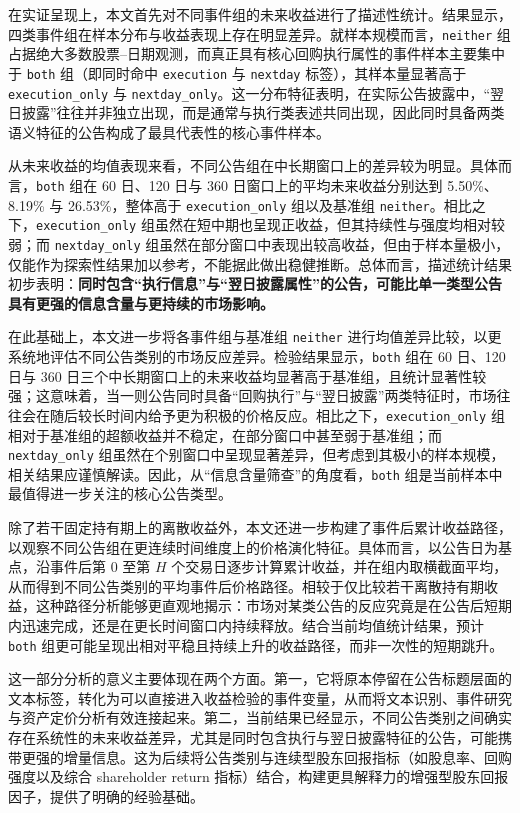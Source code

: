 \documentclass[a4paper,10pt]{article}
\begin{document}
在实证呈现上，本文首先对不同事件组的未来收益进行了描述性统计。结果显示，四类事件组在样本分布与收益表现上存在明显差异。就样本规模而言，\texttt{neither} 组占据绝大多数股票--日期观测，而真正具有核心回购执行属性的事件样本主要集中于 \texttt{both} 组（即同时命中 \texttt{execution} 与 \texttt{nextday} 标签），其样本量显著高于 \texttt{execution\_only} 与 \texttt{nextday\_only}。这一分布特征表明，在实际公告披露中，“翌日披露”往往并非独立出现，而是通常与执行类表述共同出现，因此同时具备两类语义特征的公告构成了最具代表性的核心事件样本。

从未来收益的均值表现来看，不同公告组在中长期窗口上的差异较为明显。具体而言，\texttt{both} 组在 60 日、120 日与 360 日窗口上的平均未来收益分别达到 5.50\%、8.19\% 与 26.53\%，整体高于 \texttt{execution\_only} 组以及基准组 \texttt{neither}。相比之下，\texttt{execution\_only} 组虽然在短中期也呈现正收益，但其持续性与强度均相对较弱；而 \texttt{nextday\_only} 组虽然在部分窗口中表现出较高收益，但由于样本量极小，仅能作为探索性结果加以参考，不能据此做出稳健推断。总体而言，描述统计结果初步表明：\textbf{同时包含“执行信息”与“翌日披露属性”的公告，可能比单一类型公告具有更强的信息含量与更持续的市场影响。}

在此基础上，本文进一步将各事件组与基准组 \texttt{neither} 进行均值差异比较，以更系统地评估不同公告类别的市场反应差异。检验结果显示，\texttt{both} 组在 60 日、120 日与 360 日三个中长期窗口上的未来收益均显著高于基准组，且统计显著性较强；这意味着，当一则公告同时具备“回购执行”与“翌日披露”两类特征时，市场往往会在随后较长时间内给予更为积极的价格反应。相比之下，\texttt{execution\_only} 组相对于基准组的超额收益并不稳定，在部分窗口中甚至弱于基准组；而 \texttt{nextday\_only} 组虽然在个别窗口中呈现显著差异，但考虑到其极小的样本规模，相关结果应谨慎解读。因此，从“信息含量筛查”的角度看，\texttt{both} 组是当前样本中最值得进一步关注的核心公告类型。

除了若干固定持有期上的离散收益外，本文还进一步构建了事件后累计收益路径，以观察不同公告组在更连续时间维度上的价格演化特征。具体而言，以公告日为基点，沿事件后第 \(0\) 至第 \(H\) 个交易日逐步计算累计收益，并在组内取横截面平均，从而得到不同公告类别的平均事件后价格路径。相较于仅比较若干离散持有期收益，这种路径分析能够更直观地揭示：市场对某类公告的反应究竟是在公告后短期内迅速完成，还是在更长时间窗口内持续释放。结合当前均值统计结果，预计 \texttt{both} 组更可能呈现出相对平稳且持续上升的收益路径，而非一次性的短期跳升。

这一部分分析的意义主要体现在两个方面。第一，它将原本停留在公告标题层面的文本标签，转化为可以直接进入收益检验的事件变量，从而将文本识别、事件研究与资产定价分析有效连接起来。第二，当前结果已经显示，不同公告类别之间确实存在系统性的未来收益差异，尤其是同时包含执行与翌日披露特征的公告，可能携带更强的增量信息。这为后续将公告类别与连续型股东回报指标（如股息率、回购强度以及综合 shareholder return 指标）结合，构建更具解释力的增强型股东回报因子，提供了明确的经验基础。
\end{document}
